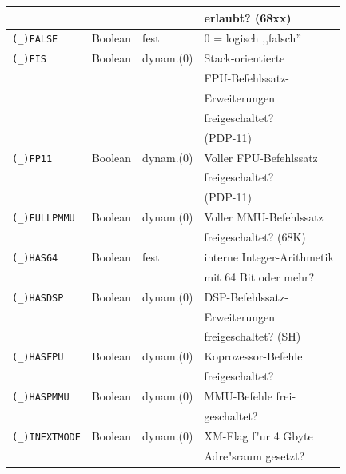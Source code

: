\documentclass[12pt,a4paper,twoside]{report}
\newcommand{\predefsym}[1]{{\tt (\_)#1}}
\begin{document}
\begin{center}
\begin{longtable}{|l|l|l|l|}
                       &             &            & erlaubt? (68xx) \\
\hline
\predefsym{FALSE}      &  Boolean    & fest       & 0 = logisch ,,falsch'' \\
\hline
\predefsym{FIS}        &  Boolean    & dynam.(0)  & Stack-orientierte \\
                       &             &            & FPU-Befehlssatz- \\
                       &             &            & Erweiterungen \\
                       &             &            & freigeschaltet? \\
                       &             &            & (PDP-11) \\
\hline
\predefsym{FP11}       &  Boolean    & dynam.(0)  & Voller FPU-Befehlssatz \\
                       &             &            & freigeschaltet? \\
                       &             &            & (PDP-11) \\
\hline
\predefsym{FULLPMMU}   &  Boolean    & dynam.(0)  & Voller MMU-Befehlssatz \\
                       &             &            & freigeschaltet? (68K) \\
\hline
\predefsym{HAS64}      &  Boolean    & fest       & interne Integer-Arithmetik \\
                       &             &            & mit 64 Bit oder mehr? \\
\hline
\predefsym{HASDSP}     &  Boolean    & dynam.(0)  & DSP-Befehlssatz- \\
                       &             &            & Erweiterungen \\
                       &             &            & freigeschaltet? (SH) \\
\hline
\predefsym{HASFPU}     &  Boolean    & dynam.(0)  & Koprozessor-Befehle \\
                       &             &            & freigeschaltet? \\
\hline
\predefsym{HASPMMU}    &  Boolean    & dynam.(0)  & MMU-Befehle frei- \\
                       &             &            & geschaltet? \\
\hline
\predefsym{INEXTMODE}  &  Boolean    & dynam.(0)  & XM-Flag f"ur 4 Gbyte \\
                       &             &            & Adre"sraum gesetzt? \\

\end{longtable}
\end{center}
\end{document}
